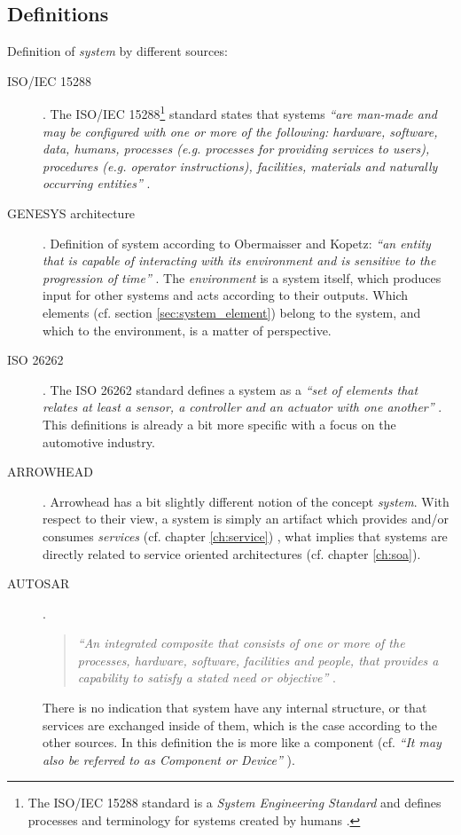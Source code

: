 \subsection{Definitions}
Definition of \emph{system} by different sources:
\begin{description}
\item [ISO/IEC 15288] .
The ISO/IEC 15288\footnote{The ISO/IEC 15288 standard is a \emph{System Engineering Standard} and defines processes and terminology for systems created by humans \cite{ISO_15288}.} standard states that systems \textit{``are man-made and may be configured with one or more of the following: hardware, software, data, humans, processes (e.g. processes for providing services to users), procedures (e.g. operator instructions), facilities, materials and naturally occurring entities''} \cite{ISO_15288}.

\item [GENESYS architecture].
Definition of system according to Obermaisser and Kopetz: \emph{``an entity that is capable of interacting with its environment and is sensitive to the progression of time''} \cite[p.7]{genesys}.
The \emph{environment} is a system itself, which produces input for other systems and acts according to their outputs. Which elements (cf. section \ref{sec:system_element}) belong to the system, and which to the environment, is a matter of perspective. 

\item [ISO 26262].
The ISO 26262 standard defines a system as a \emph{``set of elements that relates at least a sensor, a controller and an actuator with one another''} \cite{iso26262:1}. This definitions is already a bit more specific with a focus on the automotive industry.

\item [ARROWHEAD].
Arrowhead has a bit slightly different notion of the concept \emph{system}. With respect to their view, a system is simply an artifact which provides and/or consumes \emph{services} (cf. chapter \ref{ch:service}) \cite{arrowhead_inpr}, what implies that systems are directly related to service oriented architectures (cf. chapter \ref{ch:soa}).

\item [AUTOSAR].
\begin{quote}
\emph{``An integrated composite that consists of one or more of the processes, hardware, software, facilities and people, that provides a capability to satisfy a stated need or objective''} \cite{autosar_glossary}.
\end{quote}

There is no indication that system have any internal structure, or that services are exchanged inside of them, which is the case according to the other sources. In this definition the is more like a component (cf. \emph{``It may also be referred to as Component or Device''} \cite{arrowhead_inpr}).
\end{description}

